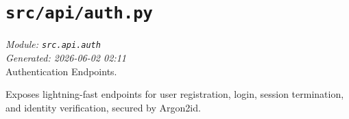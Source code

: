 
\section{\texttt{src/api/auth.py}}
\textit{Module: \texttt{src.api.auth}} \\
\textit{Generated: 2026-06-02 02:11} \\

Authentication Endpoints.

Exposes lightning-fast endpoints for user registration, login, session
termination, and identity verification, secured by Argon2id.

